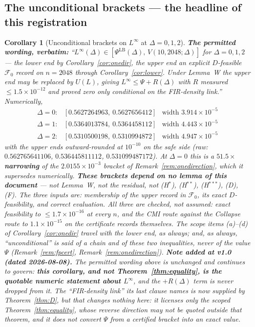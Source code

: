 \documentclass[11pt]{article}
\newtheorem{corollary}{Corollary}
\theoremstyle{definition}
\theoremstyle{remark}
\begin{document}
\subsection{The unconditional brackets --- the headline of this registration}
\label{sec:brackets}
\begin{corollary}[Unconditional brackets on $L^\infty$ at $\Delta=0,1,2$]
\label{cor:brackets}
\textbf{The permitted wording, verbatim:}
\emph{``$L^\infty(\Delta)\in[\Psi^{\mathrm{LB}}(\Delta),\,V(10,2048;\Delta)]$
for $\Delta=0,1,2$ --- the lower end by Corollary~\ref{cor:onedir}, the upper
end an explicit $D$-feasible $\mathcal F_0$ record on $n=2048$ through
Corollary~\ref{cor:lower}. Under Lemma~W the upper end may be replaced by
$U(L)$, giving $L^\infty\le\Psi+R(\Delta)$ with $R$ measured
$\le1.5\times10^{-12}$ and proved zero only conditional on the FIR-density
link.''} Numerically,
\[
\begin{array}{lll}
\Delta=0: & [0.5627264963,\ 0.5627656412] & \text{width }3.914\times10^{-5}\\
\Delta=1: & [0.5364013784,\ 0.5364458112] & \text{width }4.443\times10^{-5}\\
\Delta=2: & [0.5310500198,\ 0.5310994872] & \text{width }4.947\times10^{-5}
\end{array}
\]
with the upper ends \emph{outward-rounded at $10^{-10}$} on the safe side
(raw: $0.562765641106$, $0.536445811112$, $0.531099487172$). At $\Delta=0$
this is a $\mathbf{51.5\times}$ \textbf{narrowing} of the $2.0155\times
10^{-3}$ bracket of Remark~\ref{rem:onedirection}, which it supersedes
numerically.
\textbf{These brackets depend on \emph{no lemma of this document}} --- not
Lemma~W, not the residual, not (H$^\ast$), (H$^{\ast\ast}$),
(H$^{\ast\ast\ast}$), (D), (F). The three inputs are: membership of the upper
record in $\mathcal F_0$, its exact $D$-feasibility, and correct evaluation.
All three are checked, not assumed: exact feasibility to
$\le1.7\times10^{-16}$ at every $n$, and the CMI route against the Collapse
route to $1.1\times10^{-15}$ \emph{on the certificate records themselves}. The
scope items (a)--(d) of Corollary~\ref{cor:onedir} travel with the lower end,
as always; and, as always, ``unconditional'' is said of a chain and of these
two \emph{inequalities}, never of the value $\Psi$
(Remark~\ref{rem:fpcert}, Remark~\ref{rem:onedirection}).
\textbf{Note added at v1.0 (dated 2026-08-08).} The permitted wording above is
\emph{unchanged} and continues to govern: \textbf{this corollary, and not
Theorem~\ref{thm:equality}, is the quotable numeric statement about
$L^\infty$}, and the $+R(\Delta)$ term is never dropped from it. The
``FIR-density link'' its last clause names is now supplied by
Theorem~\ref{thm:D}, but that changes nothing here: it licenses only the
\emph{scoped} Theorem~\ref{thm:equality}, whose reverse direction may not be
quoted outside that theorem, and it does not convert $\Psi$ from a certified
bracket into an exact value.
\end{corollary}
\end{document}
